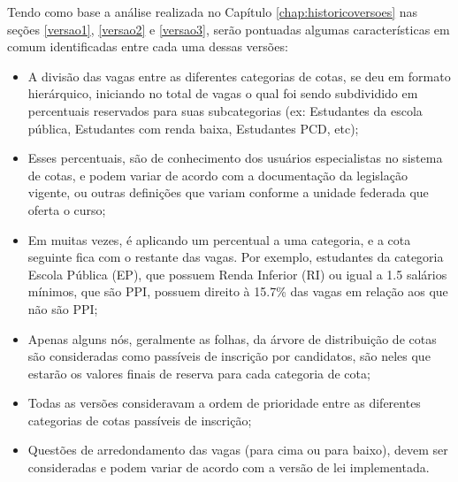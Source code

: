   
   
 Tendo como base a análise realizada no Capítulo \ref{chap:historicoversoes} nas seções \ref{versao1}, \ref{versao2} e \ref{versao3}, serão pontuadas algumas características em comum identificadas entre cada uma dessas versões:
   
   \begin{itemize}
    \item A divisão das vagas entre as diferentes categorias de cotas, se deu em formato hierárquico, iniciando no total de vagas o qual foi sendo subdividido em percentuais reservados para suas subcategorias (ex: Estudantes da escola pública, Estudantes com renda baixa, Estudantes PCD, etc); 
   
   \item Esses percentuais, são de conhecimento dos usuários especialistas no sistema de cotas, e podem variar de acordo com a documentação da legislação vigente, ou outras definições que variam conforme a unidade federada que oferta o curso; 
   
   \item Em muitas vezes, é aplicando um percentual a uma categoria, e a cota seguinte fica com o restante das vagas. Por exemplo, estudantes da categoria Escola Pública (EP), que possuem Renda Inferior (RI) ou igual a 1.5 salários mínimos, que são \gls{PPI}, possuem direito à 15.7\% das vagas em relação aos que não são \gls{PPI};
   
   \item Apenas alguns nós, geralmente as folhas, da árvore de distribuição de cotas são consideradas como passíveis de inscrição por candidatos, são neles que estarão os valores finais de reserva para cada categoria de cota;
   
   \item Todas as versões consideravam a ordem de prioridade entre as diferentes categorias de cotas passíveis de inscrição;
   
   \item Questões de arredondamento das vagas (para cima ou para baixo), devem ser consideradas e podem variar de acordo com a versão de lei implementada.

   \end{itemize}
   
   
   
   
   
   

   
   
